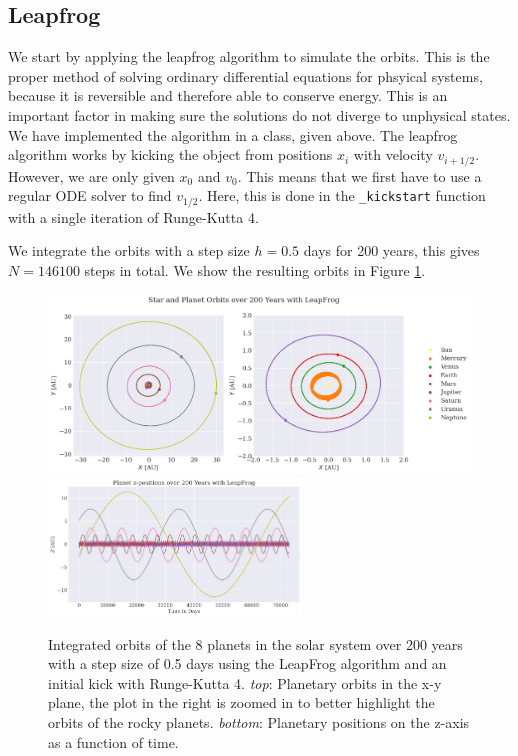 \subsection{Leapfrog}



We start by applying the leapfrog algorithm to simulate the orbits. This is the proper method of solving ordinary differential equations for phsyical systems, because it is reversible and therefore able to conserve energy. This is an important factor in making sure the solutions do not diverge to unphysical states. We have implemented the algorithm in a class, given above. The leapfrog algorithm works by kicking the object from positions $x_i$ with velocity $v_{i+1/2}$. However, we are only given $x_0$ and $v_0$. This means that we first have to use a regular ODE solver to find $v_{1/2}$. Here, this is done in the \texttt{\_kickstart} function with a single iteration of Runge-Kutta 4.

We integrate the orbits with a step size $h = 0.5$ days for 200 years, this gives $N = 146100$ steps in total. We show the resulting orbits in Figure \ref{fig:orbits_lf}.

\begin{figure}
    \centering
    \includegraphics[width=\textwidth]{results/orbits_lf.png}
    \includegraphics[width=0.6\textwidth]{results/zplane.png}
    \caption{Integrated orbits of the 8 planets in the solar system over 200 years with a step size of 0.5 days using the LeapFrog algorithm and an initial kick with Runge-Kutta 4. \textit{top}: Planetary orbits in the x-y plane, the plot in the right is zoomed in to better highlight the orbits of the rocky planets. \textit{bottom}: Planetary positions on the z-axis as a function of time.}
    \label{fig:orbits_lf}
\end{figure}

